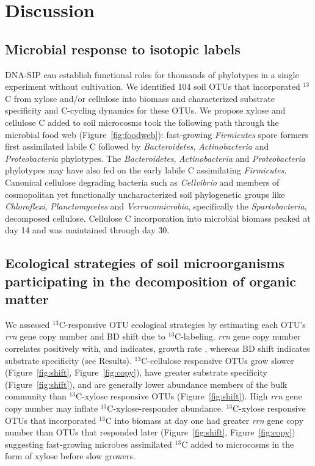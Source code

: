 \section{Discussion} 
\subsection{Microbial response to isotopic labels}
DNA-SIP can establish functional roles for thousands of phylotypes in a single
experiment without cultivation. We identified 104 soil OTUs that
incorporated $^{13}$C from xylose and/or cellulose into biomass and
characterized substrate specificity and C-cycling dynamics for these OTUs. We
propose xylose and cellulose C added to soil microcosms took the following path
through the microbial food web (Figure~\ref{fig:foodweb}): fast-growing
\textit{Firmicutes} spore formers first assimilated labile C followed by
\textit{Bacteroidetes}, \textit{Actinobacteria} and \textit{Proteobacteria}
phylotypes. The \textit{Bacteroidetes}, \textit{Actinobacteria} and
\textit{Proteobacteria} phylotypes may have also fed on the early labile
C assimilating \textit{Firmicutes}. Canonical cellulose degrading
bacteria such as \textit{Cellvibrio} and members of cosmopolitan yet
functionally uncharacterized soil phylogenetic groups like
\textit{Chloroflexi}, \textit{Planctomycetes} and \textit{Verrucomicrobia},
specifically the \textit{Spartobacteria}, decomposed cellulose. Cellulose
C incorporation into microbial biomass peaked at day 14 and was maintained
through day 30.

\subsection{Ecological strategies of soil microorganisms participating in the
decomposition of organic matter}
We assessed $^{13}$C-responsive OTU ecological strategies by estimating each
OTU's \textit{rrn} gene copy number and BD shift due to $^{13}$C-labeling.
\textit{rrn} gene copy number correlates positively with, and indicates, growth
rate \citep{11125085,Kembel_2012}, whereas BD shift indicates substrate
specificity (see Results). $^{13}$C-cellulose responsive OTUs grow slower
(Figure~\ref{fig:shift}, Figure~\ref{fig:copy}), have greater substrate
specificity (Figure~\ref{fig:shift}), and are generally lower abundance members
of the bulk community than $^{13}$C-xylose responsive OTUs
(Figure~\ref{fig:shift}). High \textit{rrn} gene copy number may inflate
$^{13}$C-xylose-responder abundance. $^{13}$C-xylose responsive OTUs that
incorporated $^{13}$C into biomass at day one had greater \textit{rrn} gene
copy number than OTUs that responded later (Figure~\ref{fig:shift},
Figure~\ref{fig:copy}) suggesting fast-growing microbes assimilated $^{13}$C
added to microcosms in the form of xylose before slow growers.

